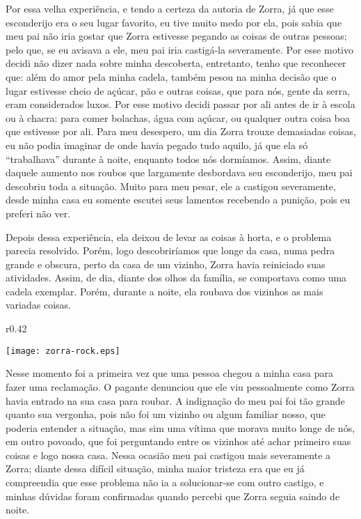 Por essa velha experiência, e tendo a certeza da autoria de Zorra, já que esse esconderijo era o seu lugar favorito, eu tive muito medo por ela, pois sabia que meu pai não iria gostar que Zorra estivesse pegando as coisas de outras pessoas; pelo que, se eu avisava a ele, meu pai iria castigá-la severamente. Por esse motivo decidi não dizer nada sobre minha descoberta, entretanto, tenho que reconhecer que: além do amor pela minha cadela, também pesou na minha decisão que o lugar estivesse cheio de açúcar, pão e outras coisas, que para nós, gente da serra, eram considerados luxos. 
Por esse motivo decidi passar por ali antes de ir à escola ou à chacra: para comer bolachas, água com açúcar, ou qualquer outra coisa boa que estivesse por ali. 
Para meu desespero, um dia Zorra trouxe demasiadas coisas, eu  não podia imaginar de onde havia pegado tudo aquilo, já que ela só ``trabalhava'' durante à noite, enquanto todos nós dormíamos. Assim, diante daquele aumento nos roubos que largamente desbordava seu esconderijo, meu pai descobriu toda a situação.
Muito para meu pesar, ele a castigou severamente, desde minha casa eu somente escutei seus lamentos recebendo a punição, pois eu preferi não ver.


Depois dessa experiência, ela deixou de levar as coisas à horta, e o problema parecia resolvido. Porém, logo descobriríamos que longe da casa, numa pedra grande e obscura, perto da casa de um vizinho, 
Zorra havia reiniciado suas atividades. Assim, de dia, diante dos olhos da família, se comportava como uma cadela exemplar. Porém, durante a noite, ela roubava dos vizinhos as mais variadas coisas.

\ifdefined\EnableIncludeImages
\begin{wrapfigure}{r}{0.42\textwidth}
  \begin{center}
  \vspace{-10pt}
    \texttt{[image: zorra-rock.eps]}
  \end{center}
  \vspace{-20pt}
\end{wrapfigure}
\fi
Nesse momento foi a primeira vez que uma pessoa chegou a minha casa para fazer uma reclamação. O pagante denunciou que ele viu pessoalmente como Zorra havia entrado na sua casa para roubar. 
A indignação do meu pai foi tão grande quanto sua vergonha, pois não foi um vizinho ou algum familiar nosso, que poderia entender a situação, mas sim uma vítima que morava muito longe de nós, em outro povoado, que foi perguntando entre os vizinhos até achar primeiro suas coisas e logo nossa casa.
Nessa ocasião meu pai castigou mais severamente a Zorra; diante dessa difícil situação, minha maior tristeza era que eu já compreendia que esse problema não ia a solucionar-se com outro castigo, e minhas dúvidas foram confirmadas quando percebi que Zorra seguia saindo de noite. 

